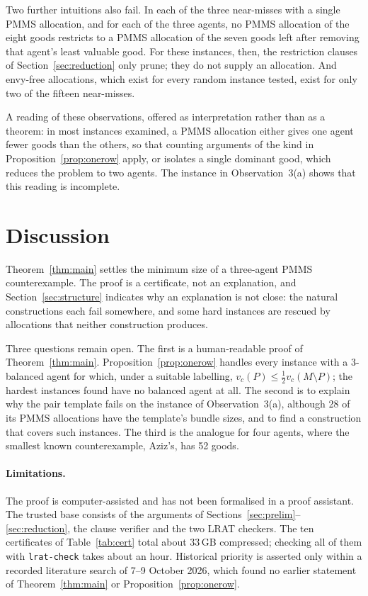 \documentclass[11pt,a4paper]{article}
\theoremstyle{remark}
\begin{document}
Two further intuitions also fail. In each of the three near-misses with a single PMMS allocation, and for each of the three agents, no PMMS allocation of the eight goods restricts to a PMMS allocation of the seven goods left after removing that agent's least valuable good. For these instances, then, the restriction clauses of Section~\ref{sec:reduction} only prune; they do not supply an allocation. And envy-free allocations, which exist for every random instance tested, exist for only two of the fifteen near-misses.

A reading of these observations, offered as interpretation rather than as a theorem: in most instances examined, a PMMS allocation either gives one agent fewer goods than the others, so that counting arguments of the kind in Proposition~\ref{prop:onerow} apply, or isolates a single dominant good, which reduces the problem to two agents. The instance in Observation~3(a) shows that this reading is incomplete.

\section{Discussion}

Theorem~\ref{thm:main} settles the minimum size of a three-agent PMMS counterexample. The proof is a certificate, not an explanation, and Section~\ref{sec:structure} indicates why an explanation is not close: the natural constructions each fail somewhere, and some hard instances are rescued by allocations that neither construction produces.

Three questions remain open. The first is a human-readable proof of Theorem~\ref{thm:main}. Proposition~\ref{prop:onerow} handles every instance with a $3$-balanced agent for which, under a suitable labelling, $v_c(P)\le\tfrac12 v_c(M\setminus P)$; the hardest instances found have no balanced agent at all. The second is to explain why the pair template fails on the instance of Observation~3(a), although 28 of its PMMS allocations have the template's bundle sizes, and to find a construction that covers such instances. The third is the analogue for four agents, where the smallest known counterexample, Aziz's, has 52 goods.

\paragraph{Limitations.} The proof is computer-assisted and has not been formalised in a proof assistant. The trusted base consists of the arguments of Sections~\ref{sec:prelim}--\ref{sec:reduction}, the clause verifier and the two LRAT checkers. The ten certificates of Table~\ref{tab:cert} total about 33\,GB compressed; checking all of them with \texttt{lrat-check} takes about an hour. Historical priority is asserted only within a recorded literature search of 7--9 October 2026, which found no earlier statement of Theorem~\ref{thm:main} or Proposition~\ref{prop:onerow}.
\end{document}
